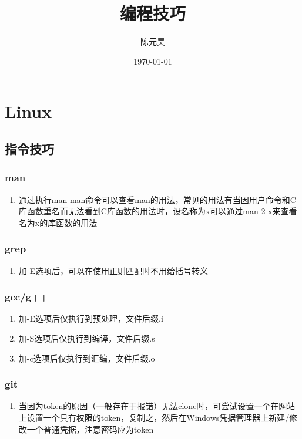 \documentclass[onecolumn]{article}
\title{编程技巧}
\author{陈元昊}
\date{\today}
\begin{document}
\maketitle
\renewcommand{\contentsname}{目录}
\tableofcontents
\section{Linux}
    \subsection{指令技巧}
        \subsubsection{man}
            \noindent
            \begin{enumerate}
                \item 通过执行man man命令可以查看man的用法，常见的用法有当因用户命令和C库函数重名而无法看到C库函数的用法时，设名称为x可以通过man 2 x来查看名为x的库函数的用法
            \end{enumerate}
        \subsubsection{grep}
            \noindent
            \begin{enumerate}
                \item 加-E选项后，可以在使用正则匹配时不用给括号转义
            \end{enumerate}
        \subsubsection{gcc/g++}
            \noindent
            \begin{enumerate}
                \item 加-E选项后仅执行到预处理，文件后缀.i
                \item 加-S选项后仅执行到编译，文件后缀.s
                \item 加-c选项后仅执行到汇编，文件后缀.o
            \end{enumerate}
        \subsubsection{git}
            \noindent
            \begin{enumerate}
                \item 当因为token的原因（一般存在于报错）无法clone时，可尝试设置一个在网站上设置一个具有权限的token，复制之，然后在Windows凭据管理器上新建/修改一个普通凭据，注意密码应为token
            \end{enumerate}
\end{document}
